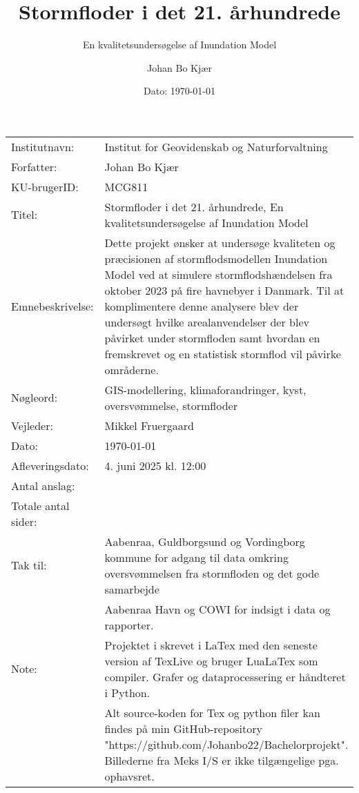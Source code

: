 \documentclass[12pt]{article}
\author{Johan Bo Kjær}
\title{Stormfloder i det 21. århundrede}
\subtitle{En kvalitetsundersøgelse af Inundation Model}
\date{Dato: {\today}}
\begin{document}
\maketitle


\onehalfspacing


\begin{table}[h]
\def\arraystretch{1.5}
\begin{tabularx}{\textwidth}{l X}
Institutnavn: & {Institut for Geovidenskab og Naturforvaltning}  \\
Forfatter: & {Johan Bo Kjær} \\
KU-brugerID: & {MCG811} \\
Titel: & {Stormfloder i det 21. århundrede, En kvalitetsundersøgelse af Inundation Model} \\
Emnebeskrivelse: & Dette projekt ønsker at undersøge kvaliteten og præcisionen af stormflodsmodellen Inundation Model ved at simulere stormflodshændelsen fra oktober 2023 på fire havnebyer i Danmark. Til at komplimentere denne analysere blev der undersøgt hvilke arealanvendelser der blev påvirket under stormfloden samt hvordan en fremskrevet og en statistisk stormflod vil påvirke områderne.\\
Nøgleord: & GIS-modellering, klimaforandringer, kyst, oversvømmelse, stormfloder \\
Vejleder: & Mikkel Fruergaard \\
Dato: & \today \\
Afleveringsdato: & 4. juni 2025 kl. 12:00 \\
Antal anslag: &  \\
Totale antal sider: &  \\
Tak til: & Aabenraa, Guldborgsund og Vordingborg kommune for adgang til data omkring oversvømmelsen fra stormfloden og det gode samarbejde\\
& Aabenraa Havn og COWI for indsigt i data og rapporter. \\
Note: & Projektet i skrevet i LaTex med den seneste version af TexLive og bruger LuaLaTex som compiler. Grafer og dataprocessering er håndteret i Python.\\
& Alt source-koden for Tex og python filer kan findes på min GitHub-repository "https://github.com/Johanbo22/Bachelorprojekt". Billederne fra Meks I/S er ikke tilgængelige pga. ophavsret. 
\end{tabularx} 
\end{table}

\renewcommand{\contentsname}{Indholdsfortegnelse} %
\renewcommand{\abstractname}{Abstract} %
\renewcommand{\refname}{} %
\end{document}
